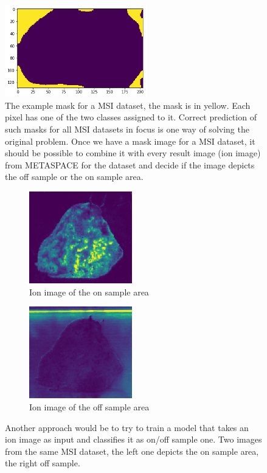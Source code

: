 \documentclass[a4paper]{article}
\begin{document}
\begin{figure}[H]
    \centering
        \includegraphics[height=4cm]{off_sample_mask_1.png}
    \caption{The example mask for a MSI dataset, the mask is in yellow.
    Each pixel has one of the two classes assigned to it.
    Correct prediction of such masks for all MSI datasets in focus is one way
    of solving the original problem. Once we have a mask image for a MSI dataset,
    it should be possible to combine it with every result image (ion image)
    from METASPACE for the dataset and decide
    if the image depicts the off sample or the on sample area.}
\end{figure}

\begin{figure}[H]
    \begin{subfigure}[b]{0.5\textwidth}
        \centering
        \includegraphics[width=\textwidth,height=4cm,keepaspectratio]{ion_image_on_sample.png}
        \caption{Ion image of the on sample area}
    \end{subfigure}
    \begin{subfigure}[b]{0.5\textwidth}
        \centering
        \includegraphics[width=\textwidth,height=4cm,keepaspectratio]{ion_image_off_sample.png}
        \caption{Ion image of the off sample area}
    \end{subfigure}
    \caption{Another approach would be to try to train a model that takes an ion image as input
    and classifies it as on/off sample one.
    Two images from the same MSI dataset, the left one depicts the on sample area,
    the right off sample.}
\end{figure}
\end{document}
